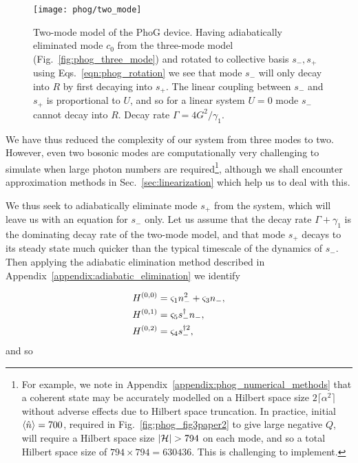 \begin{figure}[htp]
\captionsetup{width=\linewidth}
\centering
\texttt{[image: phog/two\_mode]}
\caption{\label{fig:phog_two_mode_model} Two-mode model of the PhoG device. Having adiabatically eliminated mode $c_0$ from the three-mode model (Fig.~\ref{fig:phog_three_mode}) and rotated to collective basis $s_-, s_+$ using Eqs.~\ref{eqn:phog_rotation} we see that mode $s_-$ will only decay into $R$ by first decaying into $s_+$. The linear coupling between $s_-$ and $s_+$ is proportional to $U$, and so for a linear system $U=0$ mode $s_-$ cannot decay into $R$. Decay rate $\Gamma = 4 G^2 / \gamma_1$.}
\end{figure}


We have thus reduced the complexity of our system from three modes to two. However, even two bosonic modes are computationally very challenging to simulate when large photon numbers are required\footnote{For example, we note in Appendix~\ref{appendix:phog_numerical_methods} that a coherent state may be accurately modelled on a Hilbert space size $2 \lceil \alpha^2 \rceil$ without adverse effects due to Hilbert space truncation. In practice, initial $\ev{\hat{n}} = 700$, required in Fig.~\ref{fig:phog_fig3paper2} to give large negative $Q$, will require a Hilbert space size $\left|\mathcal{H}\right| > 794$ on each mode, and so a total Hilbert space size of $794 \times 794 = 630436$. This is challenging to implement.}, although we shall encounter approximation methods in Sec.~\ref{sec:linearization} which help us to deal with this. 

We thus seek to adiabatically eliminate mode $s_+$ from the system, which will leave us with an equation for $s_-$ only. Let us assume that the decay rate $\Gamma + \gamma_1$ is the dominating decay rate of the two-mode model, and that mode $s_+$ decays to its steady state much quicker than the typical timescale of the dynamics of $s_-$. Then applying the adiabatic elimination method described in Appendix~\ref{appendix:adiabatic_elimination} we identify

\begin{align}\label{eqn:phog_single_mode_deriv_adiabatic}
H^{\left(0, 0\right)} &= \varsigma_1 n_-^2 + \varsigma_3 n_-, \notag \\ 
%
H^{\left(0, 1\right)} &= \varsigma_5 s_-^\dagger n_-, \notag \\
%
H^{\left(0, 2\right)} &= \varsigma_4 s_-^{\dagger 2},
\end{align}
and so


